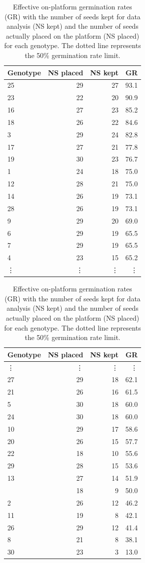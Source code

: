 \begin{table}[hbtp]
\centering
\caption[Effective germination rates]{Effective on-platform germination rates (GR) with the number of seeds kept for data analysis (NS kept) and the number 
of seeds actually placed on the platform (NS placed) for each genotype. The dotted line represents the 50\% germination rate limit.} 
\begin{minipage}{0.45\textwidth}
\begin{tabular}{lrrr}
  \toprule
Genotype & NS placed & NS kept & GR \\ 
  \midrule
25 & 29 & 27 & 93.1 \\ 
  23 & 22 & 20 & 90.9 \\ 
  16 & 27 & 23 & 85.2 \\ 
  18 & 26 & 22 & 84.6 \\ 
  3 & 29 & 24 & 82.8 \\ 
  17 & 27 & 21 & 77.8 \\ 
  19 & 30 & 23 & 76.7 \\ 
  1 & 24 & 18 & 75.0 \\ 
  12 & 28 & 21 & 75.0 \\ 
  14 & 26 & 19 & 73.1 \\ 
  28 & 26 & 19 & 73.1 \\ 
  9 & 29 & 20 & 69.0 \\ 
  6 & 29 & 19 & 65.5 \\ 
  7 & 29 & 19 & 65.5 \\ 
  4 & 23 & 15 & 65.2 \\
  \vdots & \vdots & \vdots & \vdots \\
  \bottomrule
 \end{tabular}
 
\end{minipage} \hfill
\begin{minipage}{0.45\textwidth}
 \begin{tabular}{lrrr}
   \toprule
Genotype & NS placed & NS kept & GR \\ 
  \midrule
    \vdots & \vdots & \vdots & \vdots \\
  27 & 29 & 18 & 62.1 \\ 
  21 & 26 & 16 & 61.5 \\ 
  5 & 30 & 18 & 60.0 \\ 
  24 & 30 & 18 & 60.0 \\ 
  10 & 29 & 17 & 58.6 \\ 
  20 & 26 & 15 & 57.7 \\ 
  22 & 18 & 10 & 55.6 \\ 
  29 & 28 & 15 & 53.6 \\ 
  13 & 27 & 14 & 51.9 \\\hdashline 
  15 & 18 & 9 & 50.0 \\ 
  2 & 26 & 12 & 46.2 \\ 
  11 & 19 & 8 & 42.1 \\ 
  26 & 29 & 12 & 41.4 \\ 
  8 & 21 & 8 & 38.1 \\ 
  30 & 23 & 3 & 13.0 \\ 
   \bottomrule
\end{tabular}


\end{minipage}
\end{table}
